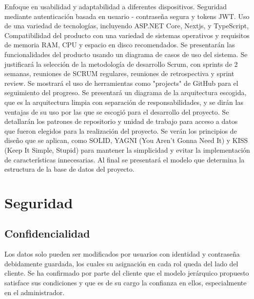 \documentclass{article} %
\begin{document}
Enfoque en usabilidad y adaptabilidad a diferentes dispositivos.
Seguridad mediante autenticación basada en usuario - contraseña segura y
tokens JWT.
Uso de una variedad de tecnologías, incluyendo ASP.NET Core, Nextjs, y TypeScript, 
Compatibilidad del producto con una variedad de sistemas operativos y requisitos de
memoria RAM, CPU y espacio en disco recomendados.
Se presentarán las funcionalidades del producto usando un diagrama de casos de uso del
sistema.
Se justificará la selección de la metodología de desarrollo Scrum, con sprints de 2 semanas,
reuniones de SCRUM regulares, reuniones de retrospectiva y sprint review.
Se mostrará el uso de herramientas como "projects" de GitHub para el seguimiento del
progreso.
Se presentará un diagrama de la arquitectura escogida, que es la arquitectura limpia con
separación de responsabilidades, y se dirán las ventajas de su uso por las que se escogió para el
desarrollo del proyecto.
Se detallarán los patrones de repositorio y unidad de trabajo para acceso a datos que fueron
elegidos para la realización del proyecto.
Se verán los principios de diseño que se aplican, como SOLID, YAGNI (You Aren't Gonna Need It) y
KISS (Keep It Simple, Stupid) para mantener la simplicidad y evitar la implementación de
características innecesarias.
Al final se presentará el modelo que determina la estructura de la base de datos del proyecto.


\section{Seguridad}
\subsection*{Confidencialidad} 
Los datos solo pueden ser modificados por usuarios con identidad y contraseña debidamente guardada, los cuales su asignación en cada rol queda del lado del cliente. Se ha confirmado por parte del cliente que el modelo jerárquico propuesto satisface sus condiciones y que es de su cargo la confianza en ellos, especialmente en el administrador. 
\end{document}
